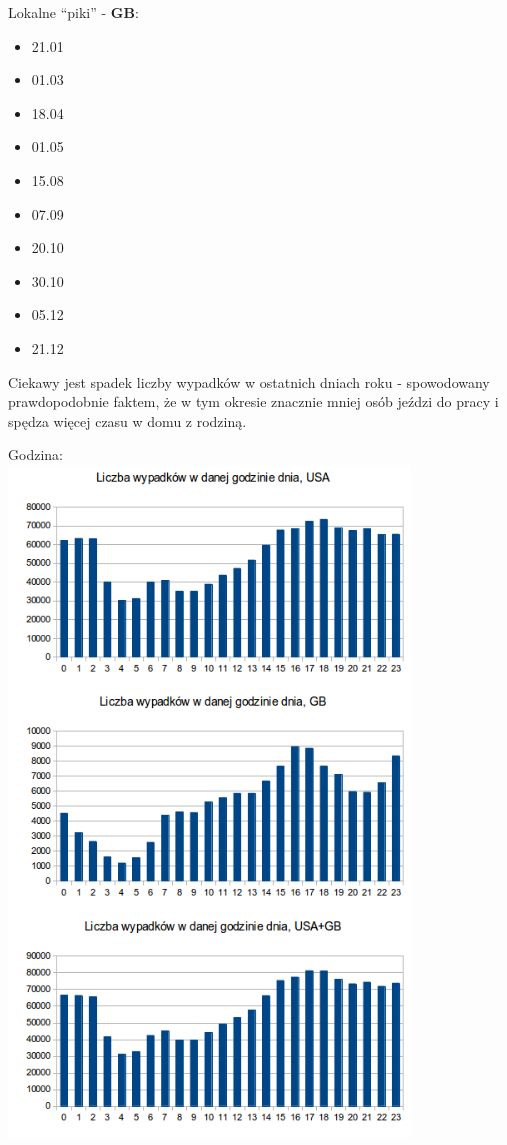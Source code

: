 Lokalne ``piki'' - \textbf{GB}:

\begin{itemize}
\itemsep1pt\parskip0pt
\item
  21.01\\
\item
  01.03\\
\item
  18.04\\
\item
  01.05\\
\item
  15.08\\
\item
  07.09\\
\item
  20.10\\
\item
  30.10\\
\item
  05.12\\
\item
  21.12
\end{itemize}

Ciekawy jest spadek liczby wypadków w ostatnich dniach roku -
spowodowany prawdopodobnie faktem, że w tym okresie znacznie mniej osób
jeździ do pracy i spędza więcej czasu w domu z rodziną.

Godzina:\\\includegraphics[width=0.8\textwidth]{images/statistics/hour.png}

